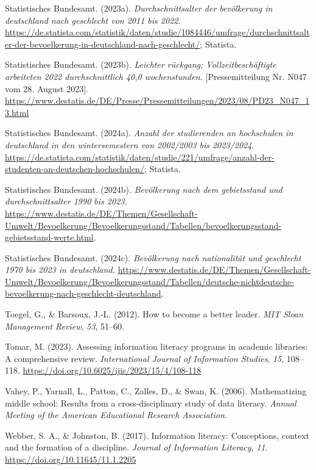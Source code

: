 \documentclass[
  12pt,
  a4paper,
  twoside]{article}
\newlength{\cslhangindent}
\newenvironment{CSLReferences}[2] %
 {\begin{list}{}{%
  \setlength{\itemindent}{0pt}
  \setlength{\leftmargin}{0pt}
  \setlength{\parsep}{0pt}
  \ifodd #1
   \setlength{\leftmargin}{\cslhangindent}
   \setlength{\itemindent}{-1\cslhangindent}
  \fi
  \setlength{\itemsep}{#2\baselineskip}}}
 {\end{list}}
\begin{document}
\begin{CSLReferences}{1}{0}
Statistisches Bundesamt. (2023a). \emph{Durchschnittsalter der bevölkerung in deutschland nach geschlecht von 2011 bis 2022}. \url{https://de.statista.com/statistik/daten/studie/1084446/umfrage/durchschnittsalter-der-bevoelkerung-in-deutschland-nach-geschlecht/}; Statista.

Statistisches Bundesamt. (2023b). \emph{Leichter rückgang: Vollzeitbeschäftigte arbeiteten 2022 durchschnittlich 40,0 wochenstunden.} {[}Pressemitteilung Nr. N047 vom 28. August 2023{]}. \url{https://www.destatis.de/DE/Presse/Pressemitteilungen/2023/08/PD23_N047_13.html}

Statistisches Bundesamt. (2024a). \emph{Anzahl der studierenden an hochschulen in deutschland in den wintersemestern von 2002/2003 bis 2023/2024}. \url{https://de.statista.com/statistik/daten/studie/221/umfrage/anzahl-der-studenten-an-deutschen-hochschulen/}; Statista.

Statistisches Bundesamt. (2024b). \emph{Bevölkerung nach dem gebietsstand und durchschnitts­alter 1990 bis 2023.} \url{https://www.destatis.de/DE/Themen/Gesellschaft-Umwelt/Bevoelkerung/Bevoelkerungsstand/Tabellen/bevoelkerungsstand-gebietsstand-werte.html}.

Statistisches Bundesamt. (2024c). \emph{Bevölkerung nach nationalität und geschlecht 1970 bis 2023 in deutschland.} \url{https://www.destatis.de/DE/Themen/Gesellschaft-Umwelt/Bevoelkerung/Bevoelkerungsstand/Tabellen/deutsche-nichtdeutsche-bevoelkerung-nach-geschlecht-deutschland}.

Toegel, G., \& Barsoux, J.-L. (2012). How to become a better leader. \emph{MIT Sloan Management Review}, \emph{53}, 51--60.

Tomar, M. (2023). Assessing information literacy programs in academic libraries: A comprehensive review. \emph{International Journal of Information Studies}, \emph{15}, 108--118. \url{https://doi.org/10.6025/ijis/2023/15/4/108-118}

Vahey, P., Yarnall, L., Patton, C., Zalles, D., \& Swan, K. (2006). Mathematizing middle school: Results from a cross-disciplinary study of data literacy. \emph{Annual Meeting of the American Educational Research Association}.

Webber, S. A., \& Johnston, B. (2017). Information literacy: Conceptions, context and the formation of a discipline. \emph{Journal of Information Literacy}, \emph{11}. \url{https://doi.org/10.11645/11.1.2205}


\end{CSLReferences}
\end{document}
